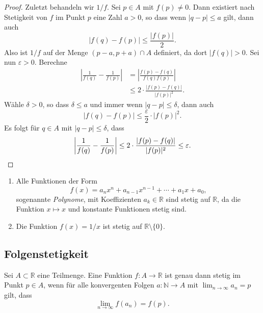 \documentclass[../main.tex]{subfiles}
\begin{document}
\begin{proof}
  Zuletzt behandeln wir $1/f$.
  Sei $p \in A$ mit $f(p) \neq 0$.
  Dann existiert nach Stetigkeit von
  $f$ im Punkt $p$ eine Zahl $a > 0$, so dass
  wenn $|q - p| \leq a$ gilt,
  dann auch
  \[
  |f(q) - f(p)| \leq \frac{|f(p)|}{2}.
  \]
  Also ist $1/f$ auf der Menge $(p-a, p+a) \cap A$ definiert,
  da dort $|f(q)| > 0$.
  Sei nun $\varepsilon > 0$. 
  Berechne
   \begin{align*}
     \left| \frac{1}{f(q)} - \frac{1}{f(p)} \right| 
     & = \left| \frac{f(p) - f(q)}{f(q)f(p)} \right| \\
     & \leq 2 \cdot \frac{|f(p) - f(q)|}{|f(p)|^2}. 
  \end{align*}
  Wähle $\delta > 0$, so dass $\delta \leq a$ 
  und immer wenn $|q - p| \leq \delta$,
  dann auch 
  \[
    |f(q) - f(p)| \leq \frac{\varepsilon}{2} \cdot |f(p)|^2.
  \]
  Es folgt für $q \in A$ mit $|q - p| \leq \delta$, dass
  \[
    \left| \frac{1}{f(q)}- \frac{1}{f(p)} \right|
    \leq 2 \cdot \frac{|f(p) - f(q)|}{|f(p)|^2} \leq \varepsilon.
    \qedhere
  \]
\end{proof}

\begin{applications}
  \leavevmode
  \begin{enumerate}[(1)]
    \item Alle Funktionen der Form
      \[
        f(x) = a_n x^n + a_{n-1} x^{n-1} + \cdots + a_{1} x + a_0,
      \]
      sogenannte \emph{Polynome},
      mit Koeffizienten $a_k \in \mathbb{R}$ sind stetig
      auf $\mathbb{R}$, da die Funktion $x \mapsto x$
      und konstante Funktionen stetig sind.
    \item Die Funktion $f(x) = 1/x$ ist stetig
      auf $\mathbb{R} \setminus \{0\}$.
  \end{enumerate}
\end{applications}

\subsection*{Folgenstetigkeit}
\begin{theorem}
  Sei $A \subset \mathbb{R}$ eine Teilmenge.
  Eine Funktion $f \colon A \to \mathbb{R}$ ist
  genau dann stetig im Punkt
  $p \in A$, wenn für alle
  konvergenten Folgen $a \colon \mathbb{N} \to A$
  mit $\lim_{n \to \infty}a_n = p$ gilt, dass
  \[
    \lim_{n \to \infty} f(a_n) = f(p).
  \]
\end{theorem}
\end{document}
